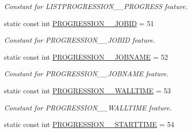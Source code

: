 \begin{DoxyCompactItemize}
\begin{DoxyCompactList}\small\item\em Constant for LISTPROGRESSION\_\-\_\-PROGRESS feature. \item\end{DoxyCompactList}\item 
\hypertarget{classTMS__Data_1_1TMS__DataPackage_a94111bf971f948a0a8cfa79f6fb99b18}{
static const int \hyperlink{classTMS__Data_1_1TMS__DataPackage_a94111bf971f948a0a8cfa79f6fb99b18}{PROGRESSION\_\-\_\-JOBID} = 51}
\label{classTMS__Data_1_1TMS__DataPackage_a94111bf971f948a0a8cfa79f6fb99b18}

\begin{DoxyCompactList}\small\item\em Constant for PROGRESSION\_\-\_\-JOBID feature. \item\end{DoxyCompactList}\item 
\hypertarget{classTMS__Data_1_1TMS__DataPackage_ab55fcc43fdaf896a267a791a7fba2ba3}{
static const int \hyperlink{classTMS__Data_1_1TMS__DataPackage_ab55fcc43fdaf896a267a791a7fba2ba3}{PROGRESSION\_\-\_\-JOBNAME} = 52}
\label{classTMS__Data_1_1TMS__DataPackage_ab55fcc43fdaf896a267a791a7fba2ba3}

\begin{DoxyCompactList}\small\item\em Constant for PROGRESSION\_\-\_\-JOBNAME feature. \item\end{DoxyCompactList}\item 
\hypertarget{classTMS__Data_1_1TMS__DataPackage_a2b2380cdb033c83fd7b7d52778a7ac24}{
static const int \hyperlink{classTMS__Data_1_1TMS__DataPackage_a2b2380cdb033c83fd7b7d52778a7ac24}{PROGRESSION\_\-\_\-WALLTIME} = 53}
\label{classTMS__Data_1_1TMS__DataPackage_a2b2380cdb033c83fd7b7d52778a7ac24}

\begin{DoxyCompactList}\small\item\em Constant for PROGRESSION\_\-\_\-WALLTIME feature. \item\end{DoxyCompactList}\item 
\hypertarget{classTMS__Data_1_1TMS__DataPackage_ac24d73a66dc61d3c7b21e49da4ba2a00}{
static const int \hyperlink{classTMS__Data_1_1TMS__DataPackage_ac24d73a66dc61d3c7b21e49da4ba2a00}{PROGRESSION\_\-\_\-STARTTIME} = 54}
\label{classTMS__Data_1_1TMS__DataPackage_ac24d73a66dc61d3c7b21e49da4ba2a00}


\end{DoxyCompactItemize}
